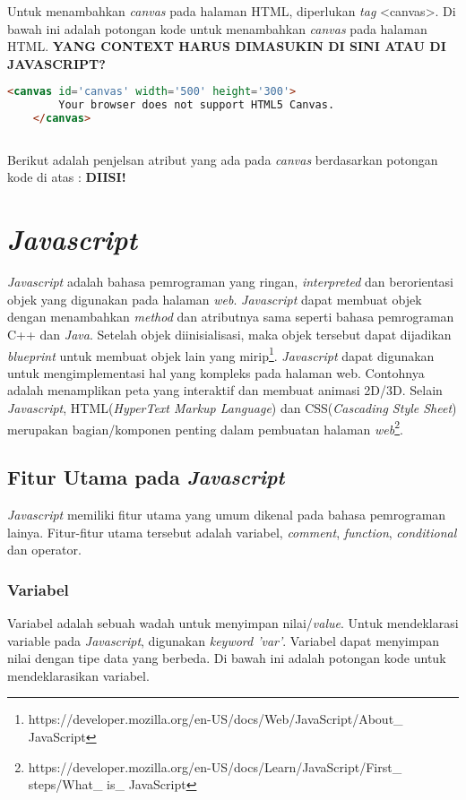 Untuk menambahkan \textit{canvas} pada halaman HTML, diperlukan \textit{tag} <canvas>. Di bawah ini adalah potongan kode untuk menambahkan \textit{canvas} pada halaman HTML. \textbf{YANG CONTEXT HARUS DIMASUKIN DI SINI ATAU DI JAVASCRIPT?}

\begin{lstlisting}[language=HTML]
	<canvas id='canvas' width='500' height='300'>
		Your browser does not support HTML5 Canvas.
	</canvas>
	
\end{lstlisting}

Berikut adalah penjelsan atribut yang ada pada \textit{canvas} berdasarkan potongan kode di atas : \textbf{DIISI!}


\section{\textit{\textit{Javascript}}}
\label{sec:Javascript}
\textit{Javascript} adalah bahasa pemrograman yang ringan, \textit{interpreted} dan berorientasi objek yang digunakan pada halaman \textit{web}. \textit{Javascript} dapat membuat objek dengan menambahkan \textit{method} dan atributnya sama seperti bahasa pemrograman C++ dan \textit{Java}. Setelah objek diinisialisasi, maka objek tersebut dapat dijadikan \textit{blueprint} untuk membuat objek lain yang mirip\footnote{https://developer.mozilla.org/en-US/docs/Web/JavaScript/About\_ JavaScript}. \textit{Javascript} dapat digunakan untuk mengimplementasi hal yang kompleks pada halaman web. Contohnya adalah menamplikan peta yang interaktif dan membuat animasi 2D/3D. Selain \textit{Javascript}, HTML(\textit{HyperText Markup Language}) dan CSS(\textit{Cascading Style Sheet}) merupakan bagian/komponen penting dalam pembuatan halaman \textit{web}\footnote{https://developer.mozilla.org/en-US/docs/Learn/JavaScript/First\_ steps/What\_ is\_ JavaScript}.\\

\subsection{Fitur Utama pada \textit{Javascript}}
\textit{Javascript} memiliki fitur utama yang umum dikenal pada bahasa pemrograman lainya. Fitur-fitur utama tersebut adalah variabel, \textit{comment}, \textit{function}, \textit{conditional} dan operator. 

\subsubsection{Variabel}
Variabel adalah sebuah wadah untuk menyimpan nilai/\textit{value}. Untuk mendeklarasi variable pada \textit{Javascript}, digunakan \textit{keyword 'var'}. Variabel dapat menyimpan nilai dengan tipe data yang berbeda. Di bawah ini adalah potongan kode untuk mendeklarasikan variabel.


